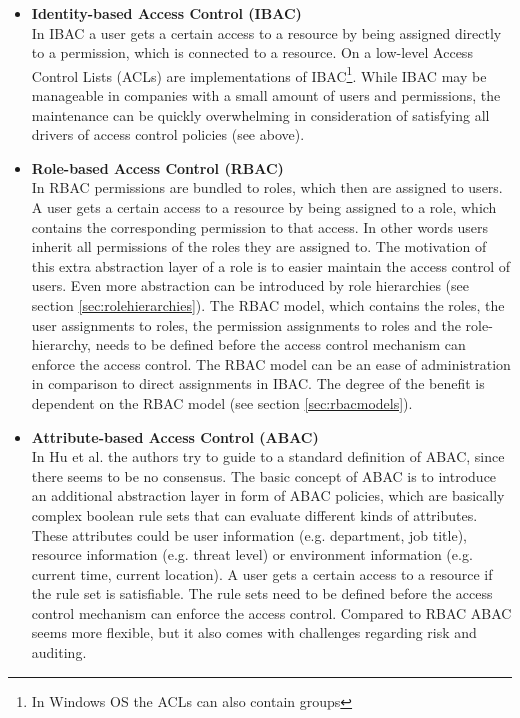     \begin{itemize}
        \item \textbf{Identity-based Access Control (IBAC)}\\
        In IBAC a user gets a certain access to a resource by being assigned directly to a permission, which is connected to a resource. On a low-level Access Control Lists (ACLs) are implementations of IBAC\footnote{In Windows OS the ACLs can also contain groups}. While IBAC may be manageable in companies with a small amount of users and permissions, the maintenance can be quickly overwhelming in consideration of satisfying all drivers of access control policies (see above).
        
        \item \textbf{Role-based Access Control (RBAC)}\\
        In RBAC permissions are bundled to roles, which then are assigned to users. A user gets a certain access to a resource by being assigned to a role, which contains the corresponding permission to that access. In other words users inherit all permissions of the roles they are assigned to. The motivation of this extra abstraction layer of a role is to easier maintain the access control of users.
        Even more abstraction can be introduced by role hierarchies (see section \ref{sec:rolehierarchies}). \iffalse , where a role inherits all permissions of its parent-role.\fi The RBAC model, which contains the roles, the user assignments to roles, the permission assignments to roles and the role-hierarchy, needs to be defined before the access control mechanism can enforce the access control. The RBAC model can be an ease of administration in comparison to direct assignments in IBAC. The degree of the benefit is dependent on the RBAC model (see section \ref{sec:rbacmodels}).
        
        \item \textbf{Attribute-based Access Control (ABAC)}\\
        In Hu et al.\cite{Hu13guideto} the authors try to guide to a standard definition of ABAC, since there seems to be no consensus. The basic concept of ABAC is to introduce an additional abstraction layer in form of ABAC policies, which are basically complex boolean rule sets that can evaluate different kinds of attributes. These attributes could be user information (e.g. department, job title), resource information (e.g. threat level) or environment information (e.g. current time, current location). A user gets a certain access to a resource if the rule set is satisfiable. The rule sets need to be defined before the access control mechanism can enforce the access control. Compared to RBAC ABAC seems more flexible, but it also comes with challenges regarding risk and auditing\cite{Coyne:2013}.        
    \end{itemize}
    
